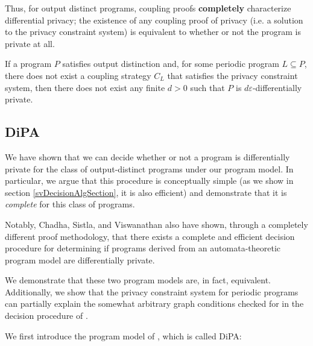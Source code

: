 Thus, for output distinct programs, coupling proofs \textbf{completely} characterize differential privacy; the existence of any coupling proof of privacy (i.e. a solution to the privacy constraint system) is equivalent to whether or not the program is private at all.

\begin{thm}\label{ProgramCounterexampleThm}
    If a program $P$ satisfies output distinction and, for some periodic program $L\subseteq P$, there does not exist a coupling strategy $C_L$ that satisfies the privacy constraint system, then there does not exist any finite $d>0$ such that $P$ is $d\varepsilon$-differentially private.
\end{thm}

\subsection{DiPA}\label{svDiPASection}

We have shown that we can decide whether or not a program is differentially private for the class of output-distinct programs under our program model. In particular, we argue that this procedure is conceptually simple (as we show in section \ref{svDecisionAlgSection}, it is also efficient) and demonstrate that it is \textit{complete} for this class of programs.

Notably, Chadha, Sistla, and Viswanathan \cite{chadhaLinearTimeDecidability2021} also have shown, through a completely different proof methodology, that there exists a complete and efficient decision procedure for determining if programs derived from an automata-theoretic program model are differentially private. 

We demonstrate that these two program models are, in fact, equivalent. Additionally, we show that the privacy constraint system for periodic programs can partially explain the somewhat arbitrary graph conditions checked for in the decision procedure of \cite{chadhaLinearTimeDecidability2021}.

We first introduce the program model of \cite{chadhaLinearTimeDecidability2021}, which is called DiPA:

